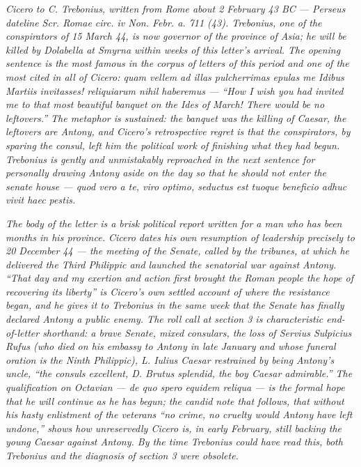 
\textit{Cicero to C. Trebonius, written from Rome about 2
February 43 BC --- Perseus dateline \textit{Scr. Romae circ.
iv Non. Febr. a. 711 (43)}. Trebonius, one of the conspirators
of 15 March 44, is now governor of the province of Asia; he
will be killed by Dolabella at Smyrna within weeks of this
letter's arrival. The opening sentence is the most famous in
the corpus of letters of this period and one of the most cited
in all of Cicero: \textit{quam vellem ad illas pulcherrimas
epulas me Idibus Martiis invitasses! reliquiarum nihil
haberemus} --- ``How I wish you had invited me to that most
beautiful banquet on the Ides of March! There would be no
leftovers.'' The metaphor is sustained: the banquet was the
killing of Caesar, the leftovers are Antony, and Cicero's
retrospective regret is that the conspirators, by sparing the
consul, left him the political work of finishing what they
had begun. Trebonius is gently and unmistakably reproached
in the next sentence for personally drawing Antony aside on
the day so that he should not enter the senate house ---
\textit{quod vero a te, viro optimo, seductus est tuoque
beneficio adhuc vivit haec pestis}.}

\textit{The body of the letter is a brisk political report
written for a man who has been months in his province. Cicero
dates his own resumption of leadership precisely to 20
December 44 --- the meeting of the Senate, called by the
tribunes, at which he delivered the Third Philippic and
launched the senatorial war against Antony. ``That day and my
exertion and action first brought the Roman people the hope
of recovering its liberty'' is Cicero's own settled account
of where the resistance began, and he gives it to Trebonius
in the same week that the Senate has finally declared Antony
a public enemy. The roll call at section 3 is characteristic
end-of-letter shorthand: a brave Senate, mixed consulars,
the loss of Servius Sulpicius Rufus (who died on his embassy
to Antony in late January and whose funeral oration is the
Ninth Philippic), L. Iulius Caesar restrained by being
Antony's uncle, ``the consuls excellent, D. Brutus splendid,
the boy Caesar admirable.'' The qualification on Octavian ---
\textit{de quo spero equidem reliqua} --- is the formal hope
that he will continue as he has begun; the candid note that
follows, that without his hasty enlistment of the veterans
``no crime, no cruelty would Antony have left undone,'' shows
how unreservedly Cicero is, in early February, still backing
the young Caesar against Antony. By the time Trebonius could
have read this, both Trebonius and the diagnosis of
section 3 were obsolete.}
